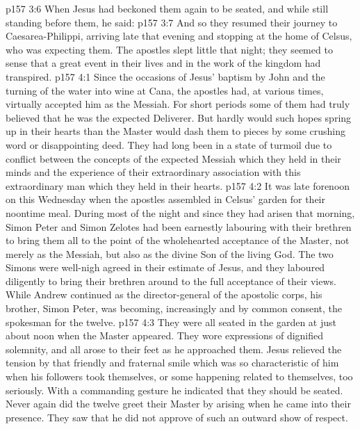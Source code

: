 \vs p157 3:6 When Jesus had beckoned them again to be seated, and while still standing before them, he said: 
\vs p157 3:7 And so they resumed their journey to Caesarea\hyp{}Philippi, arriving late that evening and stopping at the home of Celsus, who was expecting them. The apostles slept little that night; they seemed to sense that a great event in their lives and in the work of the kingdom had transpired.
\vs p157 4:1 Since the occasions of Jesus’ baptism by John and the turning of the water into wine at Cana, the apostles had, at various times, virtually accepted him as the Messiah. For short periods some of them had truly believed that he was the expected Deliverer. But hardly would such hopes spring up in their hearts than the Master would dash them to pieces by some crushing word or disappointing deed. They had long been in a state of turmoil due to conflict between the concepts of the expected Messiah which they held in their minds and the experience of their extraordinary association with this extraordinary man which they held in their hearts.
\vs p157 4:2 It was late forenoon on this Wednesday when the apostles assembled in Celsus’ garden for their noontime meal. During most of the night and since they had arisen that morning, Simon Peter and Simon Zelotes had been earnestly labouring with their brethren to bring them all to the point of the wholehearted acceptance of the Master, not merely as the Messiah, but also as the divine Son of the living God. The two Simons were well\hyp{}nigh agreed in their estimate of Jesus, and they laboured diligently to bring their brethren around to the full acceptance of their views. While Andrew continued as the director\hyp{}general of the apostolic corps, his brother, Simon Peter, was becoming, increasingly and by common consent, the spokesman for the twelve.
\vs p157 4:3 They were all seated in the garden at just about noon when the Master appeared. They wore expressions of dignified solemnity, and all arose to their feet as he approached them. Jesus relieved the tension by that friendly and fraternal smile which was so characteristic of him when his followers took themselves, or some happening related to themselves, too seriously. With a commanding gesture he indicated that they should be seated. Never again did the twelve greet their Master by arising when he came into their presence. They saw that he did not approve of such an outward show of respect.

